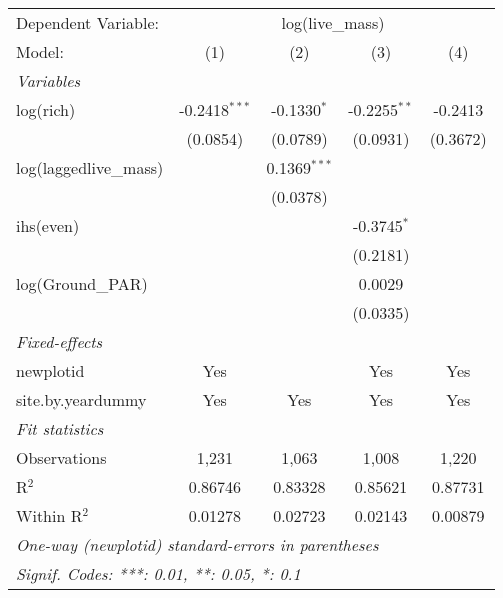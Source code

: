 \begin{tabular}{lcccc}
\tabularnewline\midrule\midrule
Dependent Variable:&\multicolumn{4}{c}{log(live\_mass)}\\
Model:&(1) & (2) & (3) & (4)\\
\midrule \emph{Variables}&   &   &   &  \\
log(rich)&-0.2418$^{***}$ & -0.1330$^{*}$ & -0.2255$^{**}$ & -0.2413\\
  &(0.0854) & (0.0789) & (0.0931) & (0.3672)\\
log(laggedlive\_mass)&   & 0.1369$^{***}$ &    &   \\
  &   & (0.0378) &    &   \\
ihs(even)&   &    & -0.3745$^{*}$ &   \\
  &   &    & (0.2181) &   \\
log(Ground\_PAR)&   &    & 0.0029 &   \\
  &   &    & (0.0335) &   \\
\midrule \emph{Fixed-effects}&   &   &   &  \\
newplotid & Yes &  & Yes & Yes\\
site.by.yeardummy & Yes & Yes & Yes & Yes\\
\midrule \emph{Fit statistics}&  & & & \\
Observations & 1,231&1,063&1,008&1,220\\
R$^2$ & 0.86746&0.83328&0.85621&0.87731\\
Within R$^2$ & 0.01278&0.02723&0.02143&0.00879\\
\midrule\midrule\multicolumn{5}{l}{\emph{One-way (newplotid) standard-errors in parentheses}}\\
\multicolumn{5}{l}{\emph{Signif. Codes: ***: 0.01, **: 0.05, *: 0.1}}\\
\end{tabular}


